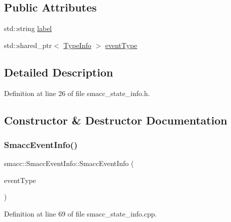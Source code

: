 \subsection*{Public Attributes}
\begin{DoxyCompactItemize}
\item 
std\+::string \hyperlink{structsmacc_1_1introspection_1_1SmaccEventInfo_a2bbed6ad8013758e23761c92d70c2fd1}{label}
\item 
std\+::shared\+\_\+ptr$<$ \hyperlink{classsmacc_1_1introspection_1_1TypeInfo}{Type\+Info} $>$ \hyperlink{structsmacc_1_1introspection_1_1SmaccEventInfo_af3bdf1abf797864e681662d92a5515f9}{event\+Type}
\end{DoxyCompactItemize}


\subsection{Detailed Description}


Definition at line 26 of file smacc\+\_\+state\+\_\+info.\+h.



\subsection{Constructor \& Destructor Documentation}
\mbox{\label{structsmacc_1_1introspection_1_1SmaccEventInfo_a322035851e387c9cb58bc1cfe4c68544}} 
\subsubsection{\texorpdfstring{Smacc\+Event\+Info()}{SmaccEventInfo()}}
{\footnotesize\ttfamily smacc\+::\+Smacc\+Event\+Info\+::\+Smacc\+Event\+Info (\begin{DoxyParamCaption}\item[{std\+::shared\+\_\+ptr$<$ \hyperlink{classsmacc_1_1introspection_1_1TypeInfo}{Type\+Info} $>$}]{event\+Type }\end{DoxyParamCaption})}



Definition at line 69 of file smacc\+\_\+state\+\_\+info.\+cpp.


